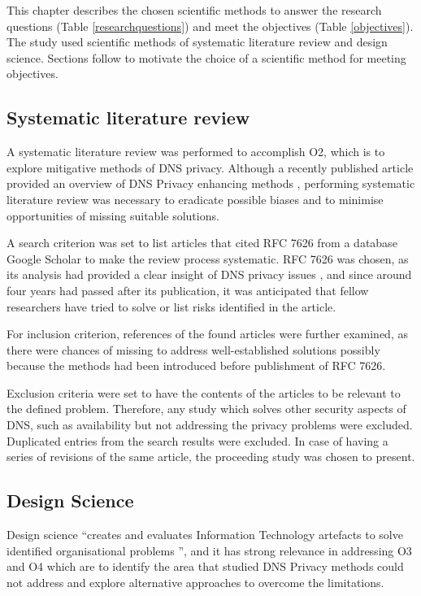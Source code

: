 
This chapter describes the chosen scientific methods to answer the research questions (Table \ref{researchquestions}) and meet the objectives (Table \ref{objectives}).
The study used scientific methods of systematic literature review and design science.
Sections follow to motivate the choice of a scientific method for meeting objectives.
\subsection{Systematic literature review}
A systematic literature review was performed to accomplish O2, which is to explore mitigative methods of DNS privacy. Although a recently published article provided an overview of DNS Privacy enhancing methods \cite{van2018privacy}, performing systematic literature review was necessary to eradicate possible biases and to minimise opportunities of missing suitable solutions.

A search criterion was set to list articles that cited RFC 7626 from a database Google Scholar to make the review process systematic. RFC 7626 was chosen, as its analysis had provided a clear insight of DNS privacy issues \cite{rfc7626}, and since around four years had passed after its publication, it was anticipated that fellow researchers have tried to solve or list risks identified in the article.

For inclusion criterion, references of the found articles were further examined, as there were chances of missing to address well-established solutions possibly because the methods had been introduced before publishment of RFC 7626.

Exclusion criteria were set to have the contents of the articles to be relevant to the defined problem.
Therefore, any study which solves other security aspects of DNS, such as availability but not addressing the privacy problems were excluded.
Duplicated entries from the search results were excluded.
In case of having a series of revisions of the same article, the proceeding study was chosen to present.

\subsection{Design Science}
Design science ``creates and evaluates Information Technology artefacts to solve identified organisational problems \cite{von2004design}'', and it has strong relevance in addressing O3 and O4 which are to identify the area that studied DNS Privacy methods could not address and explore alternative approaches to overcome the limitations.

